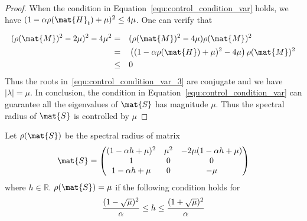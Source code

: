 \begin{lemma}
\begin{proof}
	When the condition in Equation~\eqref{equ:control_condition_var} holds, we have $(1 - \alpha \rho(\mat{H}_t) + \mu)^2 \leq 4\mu$. One can verify that 
	
	\begin{equation}
		\begin{aligned}
			(\rho(\mat{M})^2 - 2\mu)^2 - 4\mu^2 & = && (\rho(\mat{M})^2 - 4\mu)\rho(\mat{M})^2 \\
			& = &&\left( (1 - \alpha \rho(\mat{H} ) + \mu)^2 - 4\mu\right)\rho(\mat{M})^2 \\
			& \leq && 0
		\end{aligned}
	\end{equation}
	Thus the roots in~\eqref{equ:control_condition_var_3} are conjugate and we have $| \lambda | = \mu$. In conclusion, the condition in Equation~\eqref{equ:control_condition_var} can guarantee all the eigenvalues of $\mat{S}$ has magnitude $\mu$. Thus the spectral radius of $\mat{S}$ is controlled by $\mu$
\end{proof}

\end{lemma}

\begin{corollary}
	
Let $\rho(\mat{S})$ be the spectral radius of matrix 
\begin{equation}
\mat{S} = {\begin{pmatrix}
(1-\alpha h + \mu)^2 &  \mu^2 & -2\mu(1-\alpha h + \mu)\\
1 & 0 & 0 \\
1-\alpha h + \mu & 0 & - \mu
\end{pmatrix}}
\end{equation}
where $h\in \mathbb{R}$.
$\rho(\mat{S})=\mu$ if the following condition holds for
\begin{equation}
{(1-\sqrt{\mu})^2\over \alpha} \leq h \leq {(1+\sqrt{\mu})^2\over \alpha}
\label{equ:control_condition_var}
\end{equation}

\end{corollary}

